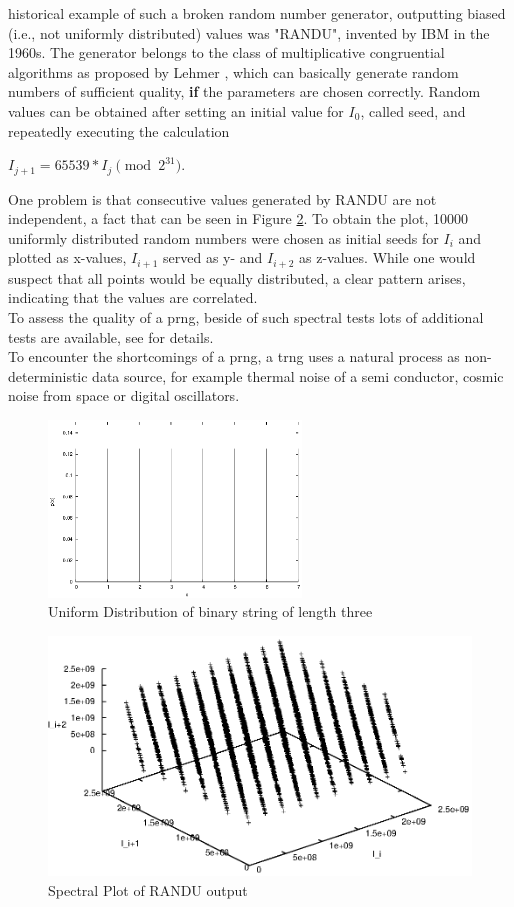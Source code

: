 historical example of such a broken random number generator, outputting biased (i.e., not uniformly distributed) values was "RANDU", invented by IBM in the
1960s. 
The generator belongs to the class of multiplicative congruential algorithms as proposed by Lehmer \cite{MR0044899}, which can basically generate random
numbers of sufficient quality, \textbf{if} the parameters are chosen correctly.
Random values can be obtained after setting an initial value for $I_0$, called seed, and repeatedly executing the calculation
\begin{center}
 $I_{j+1} = 65539 * I_j \pmod{2^{31}}$.
\end{center}
One problem 
is that consecutive values generated by RANDU are not independent, a fact that	 can be seen in Figure \ref{fig:randu}. To obtain the plot, 10000 uniformly distributed 
random numbers were chosen as initial seeds for $I_i$ and plotted as x-values, $I_{i+1}$ served as y- and $I_{i+2}$ as z-values. While one would suspect that all points
would be equally distributed, a clear pattern arises, indicating that the values are correlated.
\\
To assess the quality of a \gls{prng}, beside of such spectral tests lots of additional tests are available, see \cite{nistRAND} for details.
\\
To encounter the shortcomings of a \gls{prng}, a \gls{trng} uses a natural process as non-deterministic data source, for example
thermal noise of a semi conductor, cosmic noise from space or digital oscillators.
\begin{figure}
    \centering
    \includegraphics[width=0.6\textwidth]{figures/uniform}
    \caption{Uniform Distribution of binary string of length three}
    \label{fig:uniform}
\end{figure}
\begin{figure}
    \centering
    \includegraphics[width=1\textwidth]{figures/randu}
    \caption{Spectral Plot of RANDU output}
    \label{fig:randu}
\end{figure}

